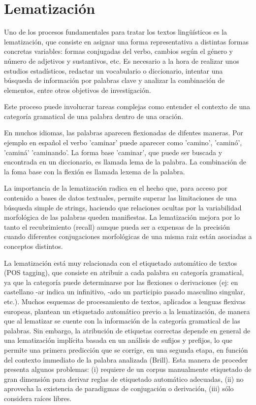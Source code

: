 \section{Lematizaci\'on}
Uno de los procesos fundamentales para tratar los textos ling\"u\'isticos es la lematizaci\'on, que consiste en asignar una forma representativa a distintas formas concretas variables: formas conjugadas del verbo, cambios seg\'un el g\'enero y n\'umero de adjetivos y sustantivos, etc. Es necesario a la hora de realizar unos estudios estad\'isticos, redactar un vocabulario o diccionario, intentar una b\'usqueda de informaci\'on por palabras clave y analizar la combinaci\'on de elementos, entre otros objetivos de investigaci\'on.

Este proceso puede involucrar tareas complejas como entender el contexto de una categor\'ia gramatical de una palabra dentro de una oraci\'on. 

En muchos idiomas, las palabras aparecen flexionadas de difentes maneras. Por ejemplo en espa\~nol el verbo 'caminar' puede aparecer como 'camino', 'camin\'o', 'camin\'a' 'caminando'. La forma base 'caminar', que puede ser buscada y encontrada en un diccionario, es llamada lema de la palabra. La combinaci\'on de la foma base con la flexi\'on es llamada lexema de la palabra.


La importancia de la lematizaci\'on radica en el hecho que, para acceso por contenido a bases de datos textuales, permite superar las limitaciones de una b\'usqueda simple de strings, haciendo que relaciones ocultas por la variabilidad morfol\'ogica de las palabras queden manifiestas. La lematizaci\'on mejora por lo tanto el recubrimiento (recall) aunque pueda ser a expensas de la precisi\'on cuando diferentes conjugaciones morfol\'ogicas de una misma raiz est\'an asociadas a conceptos distintos.

La lematizaci\'on est\'a muy relacionada con el etiquetado autom\'atico de textos (POS tagging), que consiste en atribuir a cada palabra su categor\'ia gramatical, ya que la categor\'ia puede determinarse por las flexiones o derivaciones (ej: en castellano -ar indica un infinitivo, -ado un participio pasado masculino singular, etc.). Muchos esquemas de procesamiento de textos, aplicados a lenguas flexivas europeas, plantean un etiquetado autom\'atico previo a la lematizaci\'on, de manera que al lematizar se cuente con la informaci\'on de la categor\'ia gramatical de las palabras. Sin embargo, la atribuci\'on de etiquetas correctas depende en general de una lematizaci\'on impl\'icita basada en un an\'alisis de sufijos y prefijos, lo que permite una primera predicci\'on que se corrige, en una segunda etapa, en funci\'on del contexto immediato de la palabra analizada (Brill). Esta manera de proceder presenta algunos problemas: (i) requiere de un corpus manualmente etiquetado de gran dimensi\'on para derivar reglas de etiquetado autom\'atico adecuadas, (ii) no aprovecha la existencia de paradigmas de conjugaci\'on o derivaci\'on, (iii) s\'olo considera ra\'ices libres. \cite{lem}